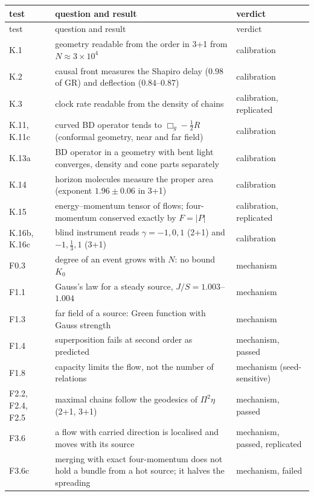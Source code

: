 {\small
\begin{xltabular}{\linewidth}{>{\raggedright\arraybackslash}p{1.9cm}>{\raggedright\arraybackslash}X>{\raggedright\arraybackslash}p{3.0cm}}
\toprule
test & question and result & verdict\\
\midrule
\endfirsthead
\toprule
test & question and result & verdict\\
\midrule
\endhead
\bottomrule
\endlastfoot
K.1 & geometry readable from the order in 3+1 from $N\approx3\times10^4$ & calibration\\
K.2 & causal front measures the Shapiro delay ($0.98$ of GR) and deflection ($0.84$--$0.87$) & calibration\\
K.3 & clock rate readable from the density of chains & calibration, replicated\\
K.11, K.11c & curved BD operator tends to $\Box_g-\tfrac12R$ (conformal geometry, near and far field) & calibration\\
K.13a & BD operator in a geometry with bent light converges, density and cone parts separately & calibration\\
K.14 & horizon molecules measure the proper area (exponent $1.96\pm0.06$ in 3+1) & calibration\\
K.15 & energy--momentum tensor of flows; four-momentum conserved exactly by $F=|P|$ & calibration, replicated\\
K.16b, K.16c & blind instrument reads $\gamma=-1,0,1$ (2+1) and $-1,\tfrac13,1$ (3+1) & calibration\\
F0.3 & degree of an event grows with $N$: no bound $K_0$ & mechanism\\
F1.1 & Gauss's law for a steady source, $J/S=1.003$--$1.004$ & mechanism\\
F1.3 & far field of a source: Green function with Gauss strength & mechanism\\
F1.4 & superposition fails at second order as predicted & mechanism, passed\\
F1.8 & capacity limits the flow, not the number of relations & mechanism (seed-sensitive)\\
F2.2, F2.4, F2.5 & maximal chains follow the geodesics of $\Pi^2\eta$ (2+1, 3+1) & mechanism, passed\\
F3.6 & a flow with carried direction is localised and moves with its source & mechanism, passed, replicated\\
F3.6c & merging with exact four-momentum does not hold a bundle from a hot source; it halves the spreading & mechanism, failed\\

\end{xltabular}}
